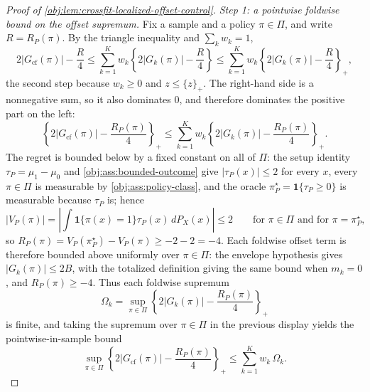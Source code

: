\begin{proof}[Proof of \cref{obj:lem:crossfit-localized-offset-control}]
\emph{Step 1: a pointwise foldwise bound on the offset supremum.}  Fix a sample and a policy \(\pi\in\Pi\), and write \(R=R_P(\pi)\).  By the triangle inequality and \(\sum_kw_k=1\),
\[
2\left|G_{\mathrm{cf}}(\pi)\right|-\frac R4
\le
\sum_{k=1}^K w_k\left\{2|G_k(\pi)|-\frac R4\right\}
\le
\sum_{k=1}^K w_k\left\{2|G_k(\pi)|-\frac R4\right\}_+ ,
\]
the second step because \(w_k\ge0\) and \(z\le\{z\}_+\).  The right-hand side is a nonnegative sum, so it also dominates \(0\), and therefore dominates the positive part on the left:
\[
\left\{2\left|G_{\mathrm{cf}}(\pi)\right|-\frac{R_P(\pi)}4\right\}_+
\le
\sum_{k=1}^K w_k\left\{2|G_k(\pi)|-\frac{R_P(\pi)}4\right\}_+ .
\]
The regret is bounded below by a fixed constant on all of \(\Pi\): the setup identity \(\tau_P=\mu_1-\mu_0\) and \cref{obj:ass:bounded-outcome} give \(|\tau_P(x)|\le2\) for every \(x\), every \(\pi\in\Pi\) is measurable by \cref{obj:ass:policy-class}, and the oracle \(\pi^\star_P=\mathbf 1\{\tau_P\ge0\}\) is measurable because \(\tau_P\) is; hence
\[
\left|V_P(\pi)\right|
=
\left|\int \mathbf 1\{\pi(x)=1\}\tau_P(x)\,dP_X(x)\right|
\le 2
\qquad\text{for }\pi\in\Pi\text{ and for }\pi=\pi^\star_P,
\]
so \(R_P(\pi)=V_P(\pi^\star_P)-V_P(\pi)\ge-2-2=-4\). %
Each foldwise offset term is therefore bounded above uniformly over \(\pi\in\Pi\): the envelope hypothesis gives \(|G_k(\pi)|\le2B\), with the totalized definition giving the same bound when \(m_k=0\), and \(R_P(\pi)\ge-4\). Thus each foldwise supremum
\[
\Omega_k=\sup_{\pi\in\Pi}\left\{2|G_k(\pi)|-\frac{R_P(\pi)}4\right\}_+
\]
is finite, and taking the supremum over \(\pi\in\Pi\) in the previous display yields the pointwise-in-sample bound
\[
\sup_{\pi\in\Pi}\left\{2\left|G_{\mathrm{cf}}(\pi)\right|-\frac{R_P(\pi)}4\right\}_+
\le
\sum_{k=1}^K w_k\,\Omega_k .
\]


\end{proof}
